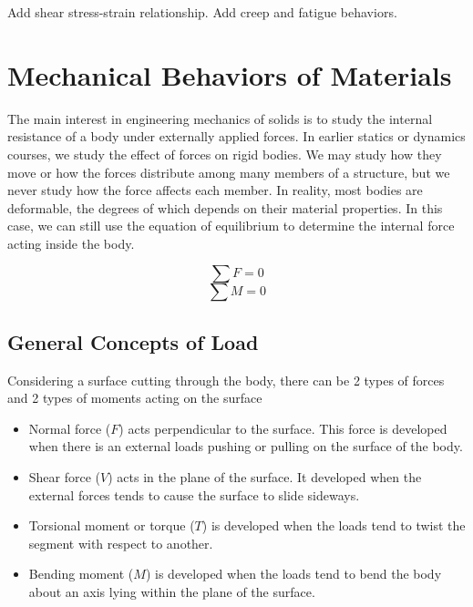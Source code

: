 \documentclass[
10pt,
a4paper,
openany,
svgnames,
]{kaobook} %
\begin{document}
Add shear stress-strain relationship. Add creep and fatigue behaviors.

\tableofcontents

\listoffigures

\listoftables

\mainmatter


\chapter{Mechanical Behaviors of Materials}
\label{chap: basic mechanics of materials}

The main interest in engineering mechanics of solids is to study the internal resistance of a body under externally applied forces. In earlier statics or dynamics courses, we study the effect of forces on rigid bodies. We may study how they move or how the forces distribute among many members of a structure, but we never study how the force affects each member. In reality, most bodies are deformable, the degrees of which depends on their material properties. In this case, we can still use the equation of equilibrium to determine the internal force acting inside the body.

$$ \sum F = 0 $$
$$ \sum M = 0 $$

\section{General Concepts of Load}

Considering a surface cutting through the body, there can be 2 types of forces and 2 types of moments acting on the surface

\begin{itemize}
  \item Normal force ($F$) acts perpendicular to the surface. This force is developed when there is an external loads pushing or pulling on the surface of the body.
  \item Shear force ($V$) acts in the plane of the surface. It developed when the external forces tends to cause the surface to slide sideways.
  \item Torsional moment or torque ($T$) is developed when the loads tend to twist the segment with respect to another.
  \item Bending moment ($M$) is developed when the loads tend to bend the body about an axis lying within the plane of the surface.
\end{itemize}
\end{document}
